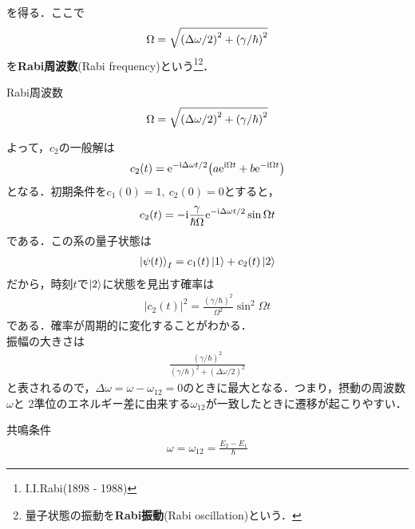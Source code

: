 \documentclass{report}
\begin{document}
  を得る．ここで
  \begin{align}
    \Omega = \sqrt{\qty(\Delta\omega/2)^2 + \qty(\gamma/\hbar)^2}
  \end{align}
  を\textbf{Rabi周波数}(Rabi frequency)という\footnote{I.I.Rabi(1898 - 1988)}\footnote{量子状態の振動を\textbf{Rabi振動}(Rabi oscillation)という．}．
  \begin{itembox}[l]{Rabi周波数}
    \begin{align}
    \Omega = \sqrt{\qty(\Delta\omega/2)^2 + \qty(\gamma/\hbar)^2}   
    \end{align}
  \end{itembox}
  よって，$c_2$の一般解は
  \begin{align}
    c_2(t) = \mathrm{e}^{ - \mathrm{i}\Delta\omega t/2}\qty(a\mathrm{e}^{\mathrm{i}\Omega t} + b\mathrm{e}^{ - \mathrm{i}\Omega t})
  \end{align}
  となる．初期条件を$c_1(0) = 1,\ c_2(0) = 0$とすると，
  \begin{align}
    c_2(t) =  - \mathrm{i}\frac{\gamma}{\hbar\Omega}\mathrm{e}^{ - \mathrm{i}\Delta\omega t/2}\sin\Omega t
  \end{align}
  である．この系の量子状態は
  \begin{align}
    \ket{\psi(t)}_I = c_1(t)\ket{1} + c_2(t)\ket{2}
  \end{align}
  だから，時刻$t$で$\ket{2}$に状態を見出す確率は
  \begin{align}
    |c_2(t)|^2 = \frac{(\gamma/\hbar)^2}{\Omega^2}\sin^2\Omega t
  \end{align}
  である．確率が周期的に変化することがわかる．\\
  振幅の大きさは
  \begin{align}
    \frac{(\gamma/\hbar)^2}{(\gamma/\hbar)^2 + (\Delta\omega/2)^2}
  \end{align}
  と表されるので，$\Delta\omega = \omega - \omega_{12} = 0$のときに最大となる．つまり，摂動の周波数$\omega$と
  2準位のエネルギー差に由来する$\omega_{12}$が一致したときに遷移が起こりやすい．
  \begin{itembox}[l]{共鳴条件}
    \begin{align}
      \omega = \omega_{12} = \frac{E_2 - E_1}{\hbar}
    \end{align}  
  \end{itembox}
\end{document}
